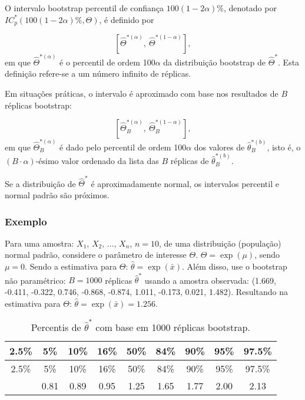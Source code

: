 \documentclass[
  letterpaper,
  DIV=11,
  numbers=noendperiod]{scrreprt}
\newcommand{\va}{$X_1,\,X_2,\,\dots,\,X_n$}
\begin{document}
O intervalo bootstrap percentil de confiança \(100(1-2\alpha)\%\),
denotado por \(IC_p^*\left(100(1-2\alpha)\%,\Theta \right)\), é definido
por

\[\left[ \hat\Theta^{*(\alpha)}, \ \hat\Theta^{*(1-\alpha)}\right],\] em
que \(\hat\Theta^{*(\alpha)}\) é o percentil de ordem 100\(\alpha\) da
distribuição bootstrap de \(\hat\Theta^*\). Esta definição refere-se a
um número infinito de réplicas.

Em situações práticas, o intervalo é aproximado com base nos resultados
de \(B\) réplicas bootstrap:

\[\left[ \hat\Theta_B^{*(\alpha)}, \ \hat\Theta_B^{*(1-\alpha)}\right],\]
em que \(\hat\Theta_B^{*(\alpha)}\) é dado pelo percentil de ordem
100\(\alpha\) dos valores de \(\hat\theta_B^{*(b)}\), isto é, o
\((B\cdot\alpha)\)-ésimo valor ordenado da lista das \(B\) réplicas de
\(\hat\theta_B^{*(b)}\).

\begin{tcolorbox}[enhanced jigsaw, coltitle=black, bottomtitle=1mm, toprule=.15mm, arc=.35mm, colframe=quarto-callout-note-color-frame, breakable, opacityback=0, bottomrule=.15mm, rightrule=.15mm, titlerule=0mm, toptitle=1mm, title=\textcolor{quarto-callout-note-color}{\faInfo}\hspace{0.5em}{Nota}, leftrule=.75mm, opacitybacktitle=0.6, left=2mm, colback=white, colbacktitle=quarto-callout-note-color!10!white]

Se a distribuição de \(\hat\Theta^{*}\) é aproximadamente normal, os
intervalos percentil e normal padrão são próximos.

\end{tcolorbox}

\subsubsection{Exemplo}\label{exemplo-8}

Para uma amostra: \va , \(n=10\), de uma distribuição (população) normal
padrão, considere o parâmetro de interesse \(\Theta\).
\(\Theta=\exp(\mu)\), sendo \(\mu=0\). Sendo a estimativa para
\(\Theta\): \(\hat{\theta}=\exp(\bar{x})\). Além disso, use o bootstrap
não paramétrico: \(B=1000\) réplicas \(\hat{\theta}^*\) usando a amostra
observada: (1.669, -0.411, -0.322, 0.746, -0.868, -0.874, 1.011, -0.173,
0.021, 1.482). Resultando na estimativa para \(\Theta\):
\(\hat{\theta}=\exp(\bar{x})=1.256\).

\begin{longtable}[]{@{}ccccccccc@{}}
\caption{Percentis de \(\hat\theta^*\) com base em 1000 réplicas
bootstrap.}\tabularnewline
\toprule\noalign{}
2.5\% & 5\% & 10\% & 16\% & 50\% & 84\% & 90\% & 95\% & 97.5\% \\
\midrule\noalign{}
\endfirsthead
\toprule\noalign{}
2.5\% & 5\% & 10\% & 16\% & 50\% & 84\% & 90\% & 95\% & 97.5\% \\
\midrule\noalign{}
\endhead
\bottomrule\noalign{}
\endlastfoot
0.74 & 0.81 & 0.89 & 0.95 & 1.25 & 1.65 & 1.77 & 2.00 & 2.13 \\
\end{longtable}
\end{document}
